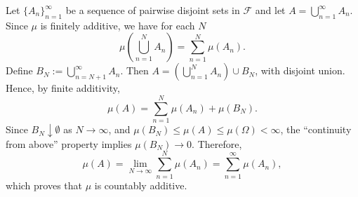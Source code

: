 Let \(\{A_n\}_{n=1}^\infty\) be a sequence of pairwise disjoint sets in $\mathcal{F}$ and let
\(A = \bigcup_{n=1}^\infty A_n.\)
Since $\mu$ is finitely additive, we have for each \(N\)
\[\mu\left( \bigcup_{n=1}^N A_n \right) = \sum_{n=1}^N \mu(A_n).\]
Define \(B_N := \bigcup_{n=N+1}^\infty A_n\).
Then \(A = \left( \bigcup_{n=1}^N A_n \right) \cup B_N\), with disjoint union. Hence, by finite 
additivity,
\[\mu(A) = \sum_{n=1}^N \mu(A_n) + \mu(B_N).\]
Since \(B_N \downarrow \emptyset\) as \(N \to \infty\), and \(\mu(B_N) \leq \mu(A) \leq \mu(\Omega) 
< \infty\), the ``continuity from above'' property implies \(\mu(B_N) \to 0.\)
Therefore,
\[\mu(A) = \lim_{N \to \infty} \sum_{n=1}^N \mu(A_n) = \sum_{n=1}^\infty \mu(A_n),\]
which proves that $\mu$ is countably additive.
